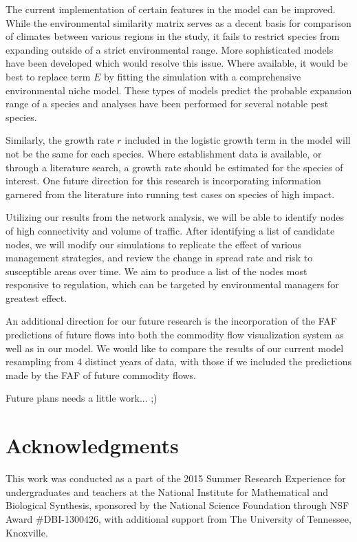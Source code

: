 \documentclass[12pt]{article}
\begin{document}
The current implementation of certain features in the model can be improved. While the environmental similarity matrix serves as a decent basis for comparison of climates between various regions in the study, it fails to restrict species from expanding outside of a strict environmental range. More sophisticated models have been developed which would resolve this issue. Where available, it would be best to replace term $E$ by fitting the simulation with a comprehensive environmental niche model. These types of models predict the probable expansion range of a species and analyses have been performed for several notable pest species.

Similarly, the growth rate $r$ included in the logistic growth term in the model will not be the same for each species. Where establishment data is available, or through a literature search, a growth rate should be estimated for the species of interest. One future direction for this research is incorporating information garnered from the literature into running test cases on species of high impact.

Utilizing our results from the network analysis, we will be able to identify nodes of high connectivity and volume of traffic. After identifying a list of candidate nodes, we will modify our simulations to replicate the effect of various management strategies, and review the change in spread rate and risk to susceptible areas over time. We aim to produce a list of the nodes most responsive to regulation, which can be targeted by environmental managers for greatest effect.

An additional direction for our future research is the incorporation of the FAF predictions of future flows into both the commodity flow visualization system as well as in our model. We would like to compare the results of our current model resampling from 4 distinct years of data, with those if we included the predictions made by the FAF of future commodity flows.

Future plans needs a little work... ;)

\section*{Acknowledgments}
This work was conducted as a part of the 2015 Summer Research Experience for undergraduates and teachers at the National Institute for Mathematical and Biological Synthesis, sponsored by the National Science Foundation through NSF Award \#DBI-1300426, with additional support from The University of Tennessee, Knoxville.
\end{document}
